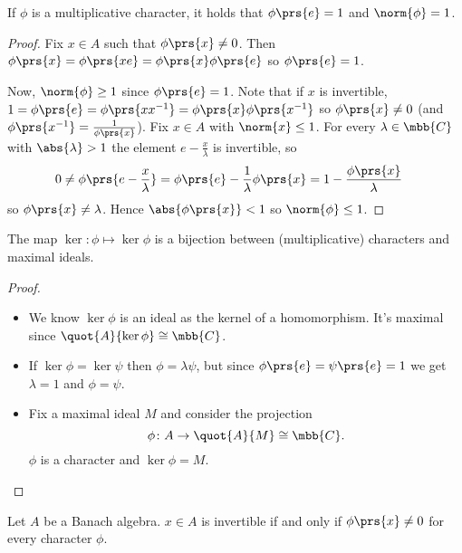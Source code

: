 \documentclass[10pt, twoside]{book}
\begin{document}
\begin{proposition}
If $\phi$ is a multiplicative character, it holds that $\phi\prs{e} = 1$ and $\norm{\phi} = 1$.
\end{proposition}

\begin{proof}
Fix $x \in A$ such that $\phi\prs{x} \neq 0$. Then $\phi\prs{x} = \phi\prs{xe} = \phi\prs{x} \phi\prs{e}$ so $\phi\prs{e} = 1$.

Now, $\norm{\phi} \geq 1$ since $\phi\prs{e} = 1$. Note that if $x$ is invertible, $1 = \phi\prs{e} = \phi\prs{x x^{-1}} = \phi\prs{x} \phi\prs{x^{-1}}$ so $\phi\prs{x} \neq 0$ (and $\phi\prs{x^{-1}} = \frac{1}{\phi\prs{x}}$).
Fix $x \in A$ with $\norm{x} \leq 1$. For every $\lambda \in \mbb{C}$ with $\abs{\lambda} > 1$ the element $e - \frac{x}{\lambda}$ is invertible, so
\begin{align*}
0 &\neq \phi\prs{e - \frac{x}{\lambda}} = \phi\prs{e} - \frac{1}{\lambda} \phi\prs{x} = 1 - \frac{\phi\prs{x}}{\lambda}
\end{align*}
so
$\phi\prs{x} \neq \lambda$. Hence $\abs{\phi\prs{x}} < 1$ so $\norm{\phi} \leq 1$.
\end{proof}

\begin{theorem}
The map $\ker \colon \phi \mapsto \ker \phi$ is a bijection between (multiplicative) characters and maximal ideals.
\end{theorem}

\begin{proof}
\begin{itemize}
\item We know $\ker \phi$ is an ideal as the kernel of a homomorphism. It's maximal since $\quot{A}{\ker \phi} \cong \mbb{C}$.

\item If $\ker \phi = \ker \psi$ then $\phi = \lambda \psi$, but since $\phi\prs{e} = \psi\prs{e} = 1$ we get $\lambda = 1$ and $\phi = \psi$.

\item Fix a maximal ideal $M$ and consider the projection
\[\phi \colon A \to \quot{A}{M} \cong \mbb{C} \text{.}\]
$\phi$ is a character and $\ker \phi = M$.
\end{itemize}
\end{proof}

\begin{corollary}
Let $A$ be a Banach algebra. $x \in A$ is invertible if and only if $\phi\prs{x} \neq 0$ for every character $\phi$.
\end{corollary}
\end{document}
